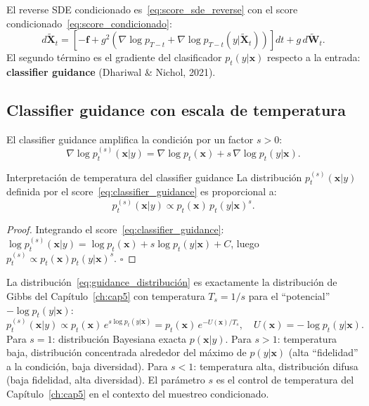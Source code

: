 El reverse SDE condicionado es~\eqref{eq:score_sde_reverse} con el score
condicionado~\eqref{eq:score_condicionado}:
\[
  d\tilde{\bm{X}}_t = \left[-\bm{f} + g^2(\nabla\log p_{T-t}
  + \nabla\log p_{T-t}(y|\tilde{\bm{X}}_t))\right]dt + g\,d\tilde{\bm{W}}_t.
\]
El segundo término es el gradiente del clasificador $p_t(y|\bm{x})$ respecto a
la entrada: \textbf{classifier guidance} (Dhariwal \& Nichol, 2021).

\subsection{Classifier guidance con escala de temperatura}
\label{subsec:classifier_guidance}

El classifier guidance amplifica la condición por un factor $s > 0$:
\begin{equation}
  \nabla\log p_t^{(s)}(\bm{x}|y)
  = \nabla\log p_t(\bm{x}) + s\,\nabla\log p_t(y|\bm{x}).
  \label{eq:classifier_guidance}
\end{equation}

\begin{proposicion}{Interpretación de temperatura del classifier guidance}
\label{prop:guidance_temperatura}
La distribución $p_t^{(s)}(\bm{x}|y)$ definida por el score~\eqref{eq:classifier_guidance}
es proporcional a:
\begin{equation}
  p_t^{(s)}(\bm{x}|y) \propto p_t(\bm{x})\,p_t(y|\bm{x})^s.
  \label{eq:guidance_distribución}
\end{equation}
\end{proposicion}

\begin{proof}
Integrando el score~\eqref{eq:classifier_guidance}:
$\log p_t^{(s)}(\bm{x}|y) = \log p_t(\bm{x}) + s\log p_t(y|\bm{x}) + C$,
luego $p_t^{(s)} \propto p_t(\bm{x})p_t(y|\bm{x})^s$. $\square$
\end{proof}

La distribución~\eqref{eq:guidance_distribución} es exactamente la distribución
de Gibbs del Capítulo~\ref{ch:cap5} con temperatura $T_s = 1/s$ para el ``potencial''
$-\log p_t(y|\bm{x})$:
\[
  p_t^{(s)}(\bm{x}|y) \propto p_t(\bm{x})\,e^{s\log p_t(y|\bm{x})}
  = p_t(\bm{x})\,e^{-U(\bm{x})/T_s}, \quad U(\bm{x}) = -\log p_t(y|\bm{x}).
\]
Para $s=1$: distribución Bayesiana exacta $p(\bm{x}|y)$.
Para $s>1$: temperatura baja, distribución concentrada alrededor del máximo de
$p(y|\bm{x})$ (alta ``fidelidad'' a la condición, baja diversidad).
Para $s<1$: temperatura alta, distribución difusa (baja fidelidad, alta diversidad).
El parámetro $s$ es el control de temperatura del Capítulo~\ref{ch:cap5} en el contexto del
muestreo condicionado.

